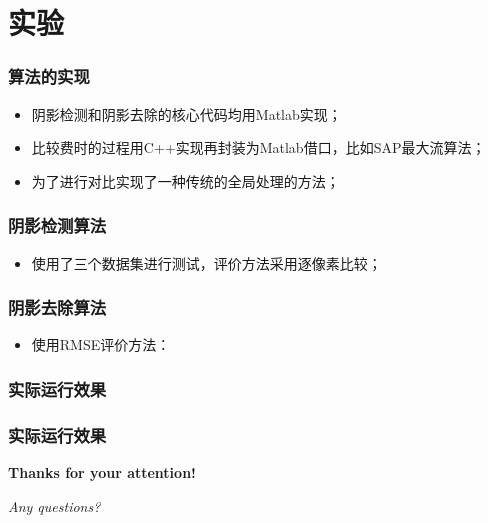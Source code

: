 \section{实验}
\begin{frame}
\frametitle{算法的实现}
\begin{itemize}
	\item 阴影检测和阴影去除的核心代码均用Matlab实现；
	\item 比较费时的过程用C++实现再封装为Matlab借口，比如SAP最大流算法；
	\item 为了进行对比实现了一种传统的全局处理的方法；
\end{itemize}
\end{frame}
\begin{frame}
\frametitle{阴影检测算法}
\begin{itemize}
	\item 使用了三个数据集进行测试，评价方法采用逐像素比较；
\end{itemize}
\begin{figure}
\center
\end{figure}
\end{frame}
\begin{frame}
\frametitle{阴影去除算法}
\begin{itemize}
	\item 使用RMSE评价方法：
\end{itemize}
\begin{figure}
\center
\end{figure}
\end{frame}
\begin{frame}
\frametitle{实际运行效果}
\end{frame}
\begin{frame}
\frametitle{实际运行效果}
\begin{figure}
\begin{minipage}[t]{0.5\linewidth}
\centering
\end{minipage}%
\begin{minipage}[t]{0.5\linewidth}
\centering
\end{minipage}
\end{figure}
\end{frame}
\begin{frame}
	\begin{spacing}{1.5}
	\begin{center}
	\Huge{\textbf{Thanks for your attention!}}

	\Huge{\textit{Any questions?}}
\end{center}
\end{spacing}
\end{frame}


